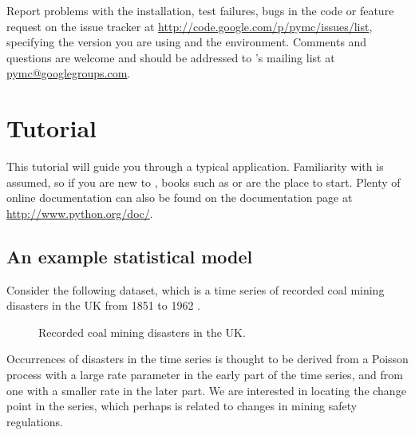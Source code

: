 \documentclass[]{jss}
\begin{document}
Report problems with the installation, test failures, bugs in the code or feature request
on the issue tracker at \href{http://code.google.com/p/pymc/issues/list}{http://code.google.com/p/pymc/issues/list},
specifying the version you are using and the environment. Comments and questions are welcome and should be
addressed to 's mailing list at \href{mailto:pymc@googlegroups.com}{pymc@googlegroups.com}.


\section[Tutorial]{Tutorial}
\label{chap:tutorial}

This tutorial will guide you through a typical  application.
Familiarity with  is assumed, so if you are new to , books such as
\citet{Lutz:2007} or \citet{Langtangen:2009} are the place to start. Plenty of
online documentation can also be found on the  documentation page at  
\href{http://www.python.org/doc/}{http://www.python.org/doc/}.

\subsection{An example statistical model}
Consider the following dataset, which is a time series of recorded coal mining
disasters in the UK from 1851 to 1962 \citep{Jarrett:1979fr}.
\begin{figure}[h!]
\begin{center}
\caption{Recorded coal mining disasters in the UK. }
\end{center}
\end{figure}
Occurrences of disasters in the time series is thought to be derived from a Poisson process with a large rate parameter in the early part of the time series, and from one with a smaller rate in the later part. We are interested in locating the change point in the series, which perhaps is related to changes in mining safety regulations.
\end{document}
